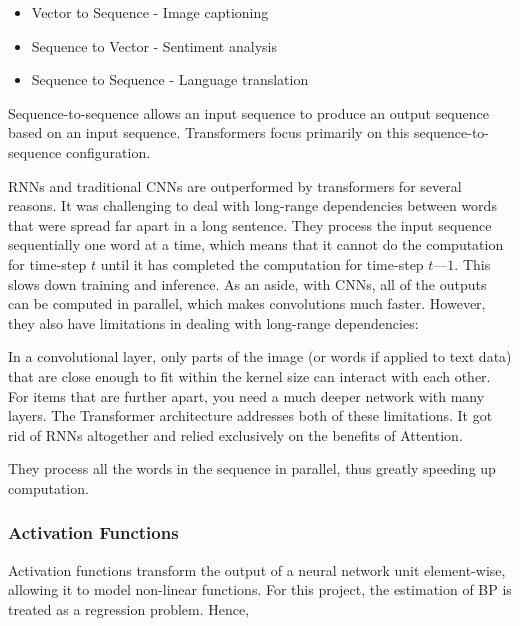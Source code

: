 \begin{itemize}
  \item Vector to Sequence - Image captioning
  \item Sequence to Vector - Sentiment analysis
  \item Sequence to Sequence - Language translation
\end{itemize}\noindent Sequence-to-sequence allows an input sequence to produce an 
output sequence based on an input sequence. Transformers focus primarily on this 
sequence-to-sequence configuration.


RNNs and traditional CNNs are outperformed by transformers for several reasons. It was challenging to 
deal with long-range dependencies between words that were spread far apart in a long sentence.
They process the input sequence sequentially one word at a time, which means that it cannot do the 
computation for time-step $t$ until it has completed the computation for time-step $t — 1$. This slows down training and inference.
As an aside, with CNNs, all of the outputs can be computed in parallel, which makes convolutions much faster. 
However, they also have limitations in dealing with long-range dependencies:

In a convolutional layer, only parts of the image (or words if applied to text data) that are close enough to fit within the kernel size can interact with each other. For items that are further apart, you need a much deeper network with many layers.
The Transformer architecture addresses both of these limitations. It got rid of RNNs altogether and relied exclusively on the benefits of Attention.

They process all the words in the sequence in parallel, thus greatly speeding up computation.







 \subsubsection{Activation Functions}
 Activation functions transform the output of a neural network unit element-wise, allowing it
to model non-linear functions. For this project, the estimation of BP is treated as a regression problem. 
Hence,

